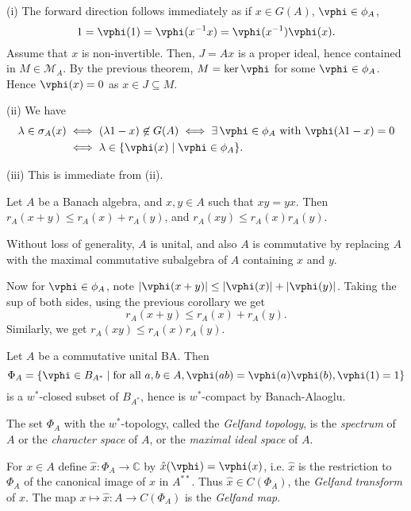 \documentclass[12pt]{article}
\begin{document}
\begin{proofbox}
	

	(i) The forward direction follows immediately as if $x \in G(A)$, $\vphi \in \phi_A$,
	\[
	1 = \vphi(1) = \vphi(x^{-1} x) = \vphi(x^{-1}) \vphi(x).
	\]
	Assume that $x$ is non-invertible. Then, $J = Ax$ is a proper ideal, hence contained in $M \in \mathcal{M}_A$. By the previous theorem, $M = \ker \vphi$ for some $\vphi \in \phi_A$. Hence $\vphi(x) = 0$ as $x \in J \subseteq M$.

	(ii) We have
	\begin{align*}
		\lambda \in \sigma_A(x) &\iff (\lambda 1 - x) \not \in G(A) \iff \exists\, \vphi \in \phi_A \text{ with } \vphi(\lambda 1 - x) = 0 \\
					&\iff \lambda \in \{\vphi(x) \mid \vphi \in \phi_A\}.
	\end{align*}

	(iii) This is immediate from (ii).
\end{proofbox}

\begin{corollary}
	Let $A$ be a Banach algebra, and $x, y \in A$ such that $xy = yx$. Then $r_A(x + y) \leq r_A(x) + r_A(y)$, and $r_A(xy) \leq r_A(x) r_A(y)$.
\end{corollary}

\begin{proofbox}
	Without loss of generality, $A$ is unital, and also $A$ is commutative by replacing $A$ with the maximal commutative subalgebra of $A$ containing $x$ and $y$.

	Now for $\vphi \in \phi_A$, note $|\vphi(x + y)| \leq |\vphi(x)| + |\vphi(y)|$. Taking the sup of both sides, using the previous corollary we get
	\[
	r_A(x + y) \leq r_A(x) + r_A(y).
	\]
	Similarly, we get $r_A(xy) \leq r_A(x)r_A(y)$.
\end{proofbox}

Let $A$ be a commutative unital BA. Then
\[
	\Phi_A = \{\vphi \in B_{A^{\ast}} \mid \text{for all } a, b \in A, \vphi(ab) = \vphi(a) \vphi(b), \vphi(1) = 1\}
\]
is a $w^{\ast}$-closed subset of $B_{A^{\ast}}$, hence is $w^{\ast}$-compact by Banach-Alaoglu.

The set $\Phi_A$ with the $w^{\ast}$-topology, called the \emph{Gelfand topology}, is the \emph{spectrum} of $A$ or the \emph{character space} of $A$, or the \emph{maximal ideal space} of $A$.

For $x \in A$ define $\hat x : \Phi_A \to \mathbb{C}$ by $\hat x(\vphi) = \vphi(x)$, i.e. $\hat x$ is the restriction to $\Phi_A$ of the canonical image of $x$ in $A^{\ast\ast}$. Thus $\hat x \in C(\Phi_A)$, the \emph{Gelfand transform} of $x$. The map $x \mapsto \hat x : A \to C(\Phi_A)$ is the \emph{Gelfand map}.
\end{document}
